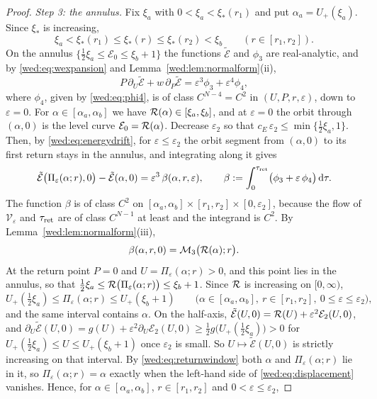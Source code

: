 \begin{proof}
\emph{Step 3: the annulus.} Fix $\xi_a$ with $0<\xi_a<\xi_*(r_1)$ and put $\alpha_a=U_+(\xi_a)$. Since $\xi_*$ is increasing,
\begin{equation}\label{wed:eq:rootwindow}
\xi_a<\xi_*(r_1)\le\xi_*(r)\le\xi_*(r_2)<\xi_b\qquad(r\in[r_1,r_2]).
\end{equation}
On the annulus $\{\tfrac12\xi_a\le\mathcal E_0\le\xi_b+1\}$ the functions $\tilde{\mathcal E}$ and $\phi_3$ are real-analytic, and by \eqref{wed:eq:wexpansion} and Lemma~\ref{wed:lem:normalform}(ii),
\[
P\,\partial_U\tilde{\mathcal E}+w\,\partial_P\tilde{\mathcal E}=\varepsilon^3\phi_3+\varepsilon^4\phi_4,
\]
where $\phi_4$, given by \eqref{wed:eq:phi4}, is of class $C^{N-4}=C^2$ in $(U,P,r,\varepsilon)$, down to $\varepsilon=0$. For $\alpha\in[\alpha_a,\alpha_b]$ we have $\mathcal R(\alpha)\in[\xi_a,\xi_b]$, and at $\varepsilon=0$ the orbit through $(\alpha,0)$ is the level curve $\mathcal E_0=\mathcal R(\alpha)$. Decrease $\varepsilon_2$ so that $c_E\,\varepsilon_2\le\min\{\tfrac12\xi_a,1\}$. Then, by \eqref{wed:eq:energydrift}, for $\varepsilon\le\varepsilon_2$ the orbit segment from $(\alpha,0)$ to its first return stays in the annulus, and integrating along it gives
\begin{equation}\label{wed:eq:displacement}
\tilde{\mathcal E}\bigl(\Pi_\varepsilon(\alpha;r),0\bigr)-\tilde{\mathcal E}(\alpha,0)=\varepsilon^3\,\beta(\alpha,r,\varepsilon),\qquad
\beta:=\int_0^{\tau_{\rm ret}}\bigl(\phi_3+\varepsilon\,\phi_4\bigr)\,\mathrm d\tau .
\end{equation}
The function $\beta$ is of class $C^2$ on $[\alpha_a,\alpha_b]\times[r_1,r_2]\times[0,\varepsilon_2]$, because the flow of $\mathcal V_\varepsilon$ and $\tau_{\rm ret}$ are of class $C^{N-1}$ at least and the integrand is $C^2$. By Lemma~\ref{wed:lem:normalform}(iii),
\begin{equation}\label{wed:eq:betazero}
\beta(\alpha,r,0)=\mathcal M_3\bigl(\mathcal R(\alpha);r\bigr).
\end{equation}
At the return point $P=0$ and $U=\Pi_\varepsilon(\alpha;r)>0$, and this point lies in the annulus, so that $\tfrac12\xi_a\le\mathcal R\bigl(\Pi_\varepsilon(\alpha;r)\bigr)\le\xi_b+1$. Since $\mathcal R$ is increasing on $[0,\infty)$,
\begin{equation}\label{wed:eq:returnwindow}
U_+(\tfrac12\xi_a)\le\Pi_\varepsilon(\alpha;r)\le U_+(\xi_b+1)\qquad\bigl(\alpha\in[\alpha_a,\alpha_b],\ r\in[r_1,r_2],\ 0\le\varepsilon\le\varepsilon_2\bigr),
\end{equation}
and the same interval contains $\alpha$. On the half-axis, $\tilde{\mathcal E}(U,0)=\mathcal R(U)+\varepsilon^2\mathcal E_2(U,0)$, and $\partial_U\tilde{\mathcal E}(U,0)=g(U)+\varepsilon^2\partial_U\mathcal E_2(U,0)\ge\tfrac12g\bigl(U_+(\tfrac12\xi_a)\bigr)>0$ for $U_+(\tfrac12\xi_a)\le U\le U_+(\xi_b+1)$ once $\varepsilon_2$ is small. So $U\mapsto\tilde{\mathcal E}(U,0)$ is strictly increasing on that interval. By \eqref{wed:eq:returnwindow} both $\alpha$ and $\Pi_\varepsilon(\alpha;r)$ lie in it, so $\Pi_\varepsilon(\alpha;r)=\alpha$ exactly when the left-hand side of \eqref{wed:eq:displacement} vanishes. Hence, for $\alpha\in[\alpha_a,\alpha_b]$, $r\in[r_1,r_2]$ and $0<\varepsilon\le\varepsilon_2$,

\end{proof}
